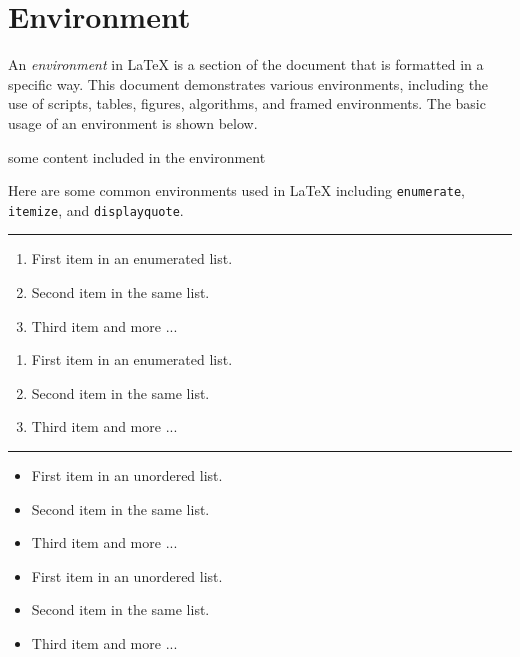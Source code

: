 \section{Environment}

An \emph{environment} in \LaTeX{} is a section of the document that is formatted in a specific way. 
This document demonstrates various environments, including the use of scripts, tables, figures, algorithms, and framed environments.
The basic usage of an environment is shown below.

\begin{latexcode}
\begin{environment}
  some content included in the environment
\end{environment}
\end{latexcode}

Here are some common environments used in \LaTeX{} including \Verb|enumerate|, \Verb|itemize|, and \Verb|displayquote|.

\noindent\rule{\linewidth}{0.5pt}

\begin{multicols}{2}
  \begin{enumerate}
    \item First item in an enumerated list.
    \item Second item in the same list.
    \item Third item and more ...
  \end{enumerate}
  \begin{latexcode}
\begin{enumerate}
  \item First item in an enumerated list.
  \item Second item in the same list.
  \item Third item and more ...
\end{enumerate}
  \end{latexcode}
\end{multicols}

\noindent\rule{\linewidth}{0.5pt}

\begin{multicols}{2}
  \begin{itemize}
    \item First item in an unordered list.
    \item Second item in the same list.
    \item Third item and more ...
  \end{itemize}
  \begin{latexcode}
\begin{itemize}
  \item First item in an unordered list.
  \item Second item in the same list.
  \item Third item and more ...
\end{itemize}
  \end{latexcode}
\end{multicols}

